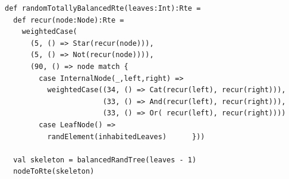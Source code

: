 \begin{lstlisting}[style=scalaioScala]
def randomTotallyBalancedRte(leaves:Int):Rte =
  def recur(node:Node):Rte =
    weightedCase(
      (5, () => Star(recur(node))),
      (5, () => Not(recur(node)))),
      (90, () => node match {
        case InternalNode(_,left,right) =>
          weightedCase((34, () => Cat(recur(left), recur(right))),
                       (33, () => And(recur(left), recur(right))),
                       (33, () => Or( recur(left), recur(right))))
        case LeafNode() =>
          randElement(inhabitedLeaves)      }))

  val skeleton = balancedRandTree(leaves - 1)
  nodeToRte(skeleton)
\end{lstlisting}
